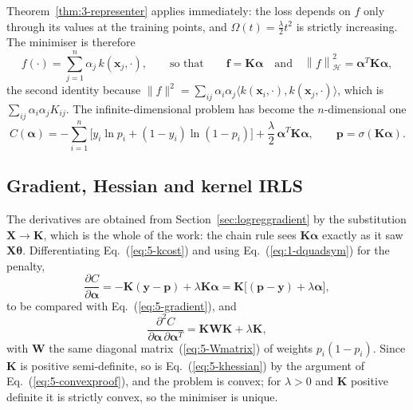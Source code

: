 Theorem~\ref{thm:3-representer} applies immediately: the loss depends on $f$
only through its values at the training points, and
$\Omega(t)=\tfrac{\lambda}{2}t^{2}$ is strictly increasing.  The minimiser is
therefore
\begin{equation}
  f(\cdot) = \sum_{j=1}^{n}\alpha_j\,k\!\left(\bm{x}_j,\cdot\right),
  \qquad\text{so that}\qquad
  \bm{f} = \bm{K}\bm{\alpha}
  \quad\text{and}\quad
  \left\|f\right\|_{\mathcal{H}}^{2}
   = \bm{\alpha}^{T}\bm{K}\bm{\alpha},
  \label{eq:5-krepresenter}
\end{equation}
the second identity because
$\|f\|^{2}=\sum_{ij}\alpha_i\alpha_j\langle k(\bm{x}_i,\cdot),
k(\bm{x}_j,\cdot)\rangle$, which is $\sum_{ij}\alpha_i\alpha_jK_{ij}$.  The
infinite-dimensional problem has become the $n$-dimensional one
\begin{equation}
  \boxed{\;
  C(\bm{\alpha}) =
    -\sum_{i=1}^{n}\Big[y_i\ln p_i+(1-y_i)\ln(1-p_i)\Big]
    + \frac{\lambda}{2}\,\bm{\alpha}^{T}\bm{K}\bm{\alpha},
  \qquad
  \bm{p} = \sigma\!\left(\bm{K}\bm{\alpha}\right). \;}
  \label{eq:5-kcost}
\end{equation}

\subsection{Gradient, Hessian and kernel IRLS}
\label{sec:kirls}

The derivatives are obtained from Section~\ref{sec:logreggradient} by the
substitution $\bm{X}\rightarrow\bm{K}$, which is the whole of the work: the
chain rule sees $\bm{K}\bm{\alpha}$ exactly as it saw $\bm{X}\bm{\theta}$.
Differentiating Eq.~(\ref{eq:5-kcost}) and using
Eq.~(\ref{eq:1-dquadsym}) for the penalty,
\begin{equation}
  \frac{\partial C}{\partial\bm{\alpha}}
   = -\bm{K}\left(\bm{y}-\bm{p}\right) + \lambda\bm{K}\bm{\alpha}
   = \bm{K}\Big[\left(\bm{p}-\bm{y}\right)+\lambda\bm{\alpha}\Big],
  \label{eq:5-kgradient}
\end{equation}
to be compared with Eq.~(\ref{eq:5-gradient}), and
\begin{equation}
  \frac{\partial^{2}C}
       {\partial\bm{\alpha}\,\partial\bm{\alpha}^{T}}
   = \bm{K}\bm{W}\bm{K} + \lambda\bm{K},
  \label{eq:5-khessian}
\end{equation}
with $\bm{W}$ the same diagonal matrix~(\ref{eq:5-Wmatrix}) of weights
$p_i(1-p_i)$.  Since $\bm{K}$ is positive semi-definite, so is
Eq.~(\ref{eq:5-khessian}) by the argument of Eq.~(\ref{eq:5-convexproof}), and
the problem is convex; for $\lambda>0$ and $\bm{K}$ positive definite it is
strictly convex, so the minimiser is unique.

